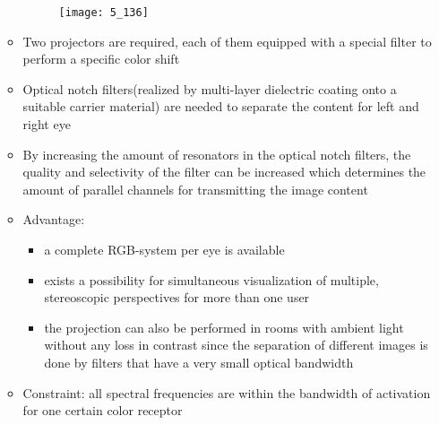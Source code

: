\documentclass{standalone}
\begin{document}
\begin{itemize}
\begin{itemize}
		\begin{figure}[H]
			\texttt{[image: 5\_136]}			
		\end{figure}
		
		\item Two projectors are required, each of them equipped with a special filter to perform a specific color shift
		\item Optical notch filters(realized by multi-layer dielectric coating onto a suitable carrier material) are needed to separate the content for left and right eye
		\item By increasing the amount of resonators in the optical notch filters, the quality and selectivity of the filter can be increased which determines the amount of parallel channels for transmitting the image content
		\item Advantage: 
			\begin{itemize}
				\item a complete RGB-system per eye is available 
				\item exists a possibility for simultaneous visualization of multiple, stereoscopic perspectives for more than one user 
				\item the projection can also be performed in rooms with ambient light without any loss in contrast since the separation of different images is done by filters that have a very small optical bandwidth
			\end{itemize}
		\item Constraint: all spectral frequencies are within the bandwidth of activation for one certain color receptor
	\end{itemize}		
\end{itemize}
\end{document}
